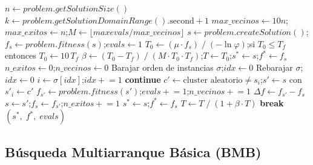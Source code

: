 \documentclass[a4paper,12pt]{article}%
\begin{document}
\begin{algorithm}[h]
	\begin{algorithmic}
		\State $n \leftarrow \textit{problem.getSolutionSize}()$
		\State $k \leftarrow \textit{problem.getSolutionDomainRange}().\text{second}+1$
		\State $\textit{max\_vecinos} \leftarrow 10n$;\quad $\textit{max\_exitos} \leftarrow n$;\quad $M \leftarrow \lfloor\textit{maxevals}/\textit{max\_vecinos}\rfloor$
		\State $s \leftarrow \textit{problem.createSolution}()$;\quad $f_s \leftarrow \textit{problem.fitness}(s)$;\quad $\textit{evals} \leftarrow 1$
		\State $T_0 \leftarrow (\mu \cdot f_s)\;/\;(-\ln\varphi)$;\quad si $T_0 \leq T_f$ entonces $T_0 \leftarrow 10\,T_f$
		\State $\beta \leftarrow (T_0-T_f)\;/\;(M \cdot T_0 \cdot T_f)$;\quad $T \leftarrow T_0$;\quad $s^* \leftarrow s$;\quad $f^* \leftarrow f_s$
		\State $\textit{n\_exitos} \leftarrow 0$;\quad $\textit{n\_vecinos} \leftarrow 0$
		\State Barajar orden de instancias $\sigma$;\quad $\textit{idx} \leftarrow 0$
		\quad Rebarajar $\sigma$;\quad $\textit{idx} \leftarrow 0$ \EndIf
		\State $i \leftarrow \sigma[\textit{idx}]$;\quad $\textit{idx} \mathrel{+}= 1$
		 \textbf{continue} \EndIf
		\State $c' \leftarrow \text{cluster aleatorio} \neq s_i$;\quad $s' \leftarrow s$ con $s'_i \leftarrow c'$
		\State $f_{s'} \leftarrow \textit{problem.fitness}(s')$;\quad $\textit{evals} \mathrel{+}= 1$;\quad $\textit{n\_vecinos} \mathrel{+}= 1$
		\State $\Delta f \leftarrow f_{s'} - f_s$
		\State $s \leftarrow s'$;\quad $f_s \leftarrow f_{s'}$;\quad $\textit{n\_exitos} \mathrel{+}= 1$
		\quad $s^* \leftarrow s$;\quad $f^* \leftarrow f_s$ \EndIf
		\EndIf
		\EndWhile
		\State $T \leftarrow T\;/\;(1+\beta\cdot T)$
		\quad \textbf{break} \EndIf
		\EndWhile
		\State \Return $(s^*,\; f^*,\; \textit{evals})$
		\EndFunction
	\end{algorithmic}
\end{algorithm}


\subsection{Búsqueda Multiarranque Básica (BMB)}
\end{document}
